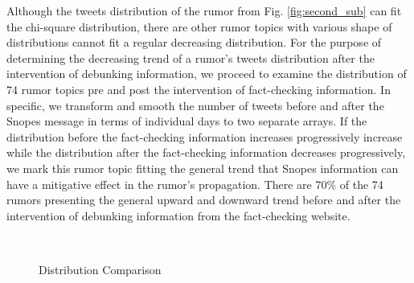 \documentclass[conference]{IEEEtran}
\begin{document}
	Although the tweets distribution of the rumor from Fig. \ref{fig:second_sub} can fit the chi-square distribution, there are other rumor topics with various shape of distributions cannot fit a regular decreasing distribution. For the purpose of determining the decreasing trend of a rumor's tweets distribution after the intervention of debunking information, we proceed to examine the distribution of 74 rumor topics pre and post the intervention of fact-checking information. In specific, we transform and smooth the number of tweets before and after the Snopes message in terms of individual days to two separate arrays. If the distribution before the fact-checking information increases progressively increase while the distribution after the fact-checking information decreases progressively, we mark this rumor topic fitting the general trend that Snopes information can have a mitigative effect in the rumor's propagation. There are 70\% of the 74 rumors presenting the general upward and downward trend before and after the intervention of debunking information from the fact-checking website.
	
	\begin{figure}
		\centering
		\\
		\caption{Distribution Comparison}
		\label{fig:distribution}
	\end{figure}
	
\end{document}
